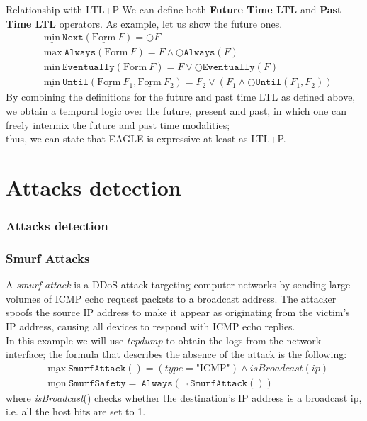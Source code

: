 \documentclass[aspectratio=169,t,xcolor=table]{beamer}
\begin{document}
\begin{frame}{Relationship with LTL+P}
    We can define both \textbf{Future Time LTL} and \textbf{Past Time LTL} operators. As example, let us show the future ones.
    \begin{align*}
        & \underline{\text{min}}\ \mathtt{Next}(\underline{\text{Form}}\ F) = \bigcirc F \\
        & \underline{\text{max}}\ \mathtt{Always}(\underline{\text{Form}}\ F) = F \land \bigcirc \mathtt{Always}(F) \\
        & \underline{\text{min}}\ \mathtt{Eventually}(\underline{\text{Form}}\ F) = F \lor \bigcirc \mathtt{Eventually}(F) \\
        & \underline{\text{min}}\ \mathtt{Until}(\underline{\text{Form}}\ F_1, \underline{\text{Form}}\ F_2) = F_2 \lor (F_1 \land \bigcirc \mathtt{Until}(F_1,F_2))
    \end{align*}
    By combining the definitions for the future and past time LTL as defined above, we obtain a temporal logic over the future, present and past, in which one can freely intermix the future and past time modalities;\\thus, we can state that EAGLE is expressive at least as LTL+P.

\end{frame}

\section{Attacks detection}
\begin{frame}{}
    \frametitle{Attacks detection}
\end{frame}

\begin{frame}
    \frametitle{Smurf Attacks}
    A \textit{smurf attack} is a DDoS attack targeting computer networks by sending large volumes of ICMP echo request packets to a broadcast address. The attacker spoofs the source IP address to make it appear as originating from the victim's IP address, causing all devices to respond with ICMP echo replies.\\
    \vspace{2.5mm}
    In this example we will use \textit{tcpdump} to obtain the logs from the network interface; the formula that describes the absence of the attack is the following:
    \begin{align*}
        & \underline{\text{max}}\ \mathtt{SmurfAttack()} = (type = \text{"ICMP"})\land isBroadcast(ip) \\
        & \underline{\text{mon}}\ \mathtt{SmurfSafety} =\ \mathtt{Always}(\neg\ \mathtt{SmurfAttack()}) 
    \end{align*}
    where \textit{isBroadcast}() checks whether the destination’s IP address is a broadcast ip, i.e. all the host bits are set to 1.
\end{frame}
\end{document}
